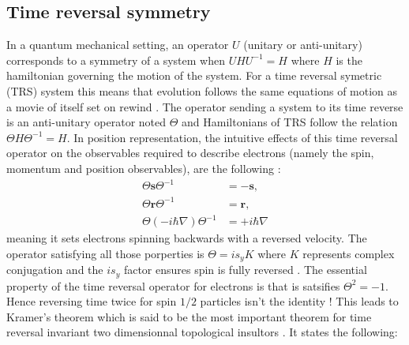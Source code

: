 \subsection{Time reversal symmetry}
In a quantum mechanical setting, an operator $U$ (unitary or anti-unitary) corresponds to a symmetry of a system when $U H U^{-1} = H$ where $H$ is the hamiltonian governing the motion of the system. For a time reversal symetric (TRS) system this means that evolution follows the same equations of motion as a movie of itself set on rewind \cite{shankar_topological_2018}. The operator sending a system to its time reverse is an anti-unitary operator noted $\Theta$ and Hamiltonians of TRS follow the relation $\Theta H \Theta^{-1} = H$. In position representation, the intuitive effects of this time reversal operator on the observables required to describe electrons (namely the spin, momentum and position observables), are the following \cite{shankar_topological_2018} : 
\begin{align*}
    \Theta \mathbf{s} \Theta^{-1} &=-\mathbf{s}, \\
    \Theta \mathbf{r} \Theta^{-1} &=\mathbf{r}, \\
    \Theta (-i\hbar\nabla) \Theta^{-1} &=+i\hbar\nabla
\end{align*}
meaning it sets electrons spinning backwards with a reversed velocity. The operator satisfying all those porperties is $\Theta = i s_y K$ where $K$ represents complex conjugation and the $i s_y$ factor ensures spin is fully reversed \cite{bernevig_topological_2013}. The essential property of the time reversal operator for electrons is that is satsifies $\Theta^2 = -1$. Hence reversing time twice for spin $1/2$ particles isn't the identity \cite{hasan_topological_2010}! This leads to Kramer's theorem which is said to be the most important theorem for time reversal invariant two dimensionnal topological insultors \cite{bernevig_topological_2013}. It states the following:\\

\\[0.3cm]

